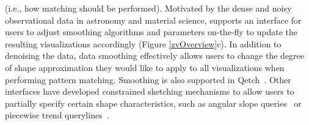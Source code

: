 (i.e., how matching should be performed). 
Motivated by the dense and noisy observational data 
in astronomy and material science, 
\zvpp supports an interface for users to 
adjust smoothing algorithms and parameters on-the-fly 
to update the resulting visualizations accordingly (Figure \ref{zvOverview}c). 
In addition to denoising the data, 
data smoothing effectively allows users to 
change the degree of shape approximation 
they would like to apply to all visualizations 
when performing pattern matching. 
Smoothing is also supported in Qetch~\cite{Mannino2018}. 
Other interfaces have developed constrained 
sketching mechanisms to allow users to 
partially specify certain shape characteristics, 
such as angular slope queries~\cite{Hochheiser2004} or 
piecewise trend querylines~\cite{ryall2005querylines}. 


